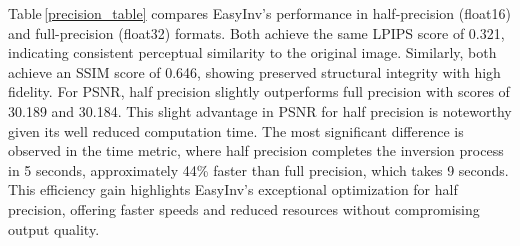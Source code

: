 \documentclass[letterpaper]{article} \usepackage{aaai25}  \usepackage{times}  \usepackage{helvet}  \usepackage{courier}  \usepackage[hyphens]{url}  \usepackage{graphicx} \urlstyle{rm} \def\UrlFont{\rm}  \usepackage{natbib}  \usepackage{caption} \frenchspacing  \setlength{\pdfpagewidth}{8.5in} \setlength{\pdfpageheight}{11in} \usepackage{algorithm}
\begin{document}
Table\,\ref{precision_table} compares EasyInv's performance in half-precision (float16) and full-precision (float32) formats. Both achieve the same LPIPS score of 0.321, indicating consistent perceptual similarity to the original image. Similarly, both achieve an SSIM score of 0.646, showing preserved structural integrity with high fidelity. For PSNR, half precision slightly outperforms full precision with scores of 30.189 and 30.184. This slight advantage in PSNR for half precision is noteworthy given its well reduced computation time. The most significant difference is observed in the time metric, where half precision completes the inversion process in 5 seconds, approximately 44\% faster than full precision, which takes 9 seconds. This efficiency gain highlights EasyInv's exceptional optimization for half precision, offering faster speeds and reduced resources without compromising output quality.
\end{document}
